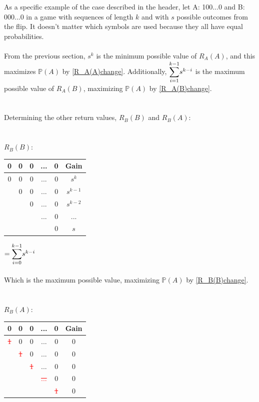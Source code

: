 \documentclass[english,12pt,a4paper,final]{article}
\begin{document}
As a specific example of the case described in the header, let A: 100...0 and B: 000...0 in a game with sequences of length $k$ and with $s$ possible outcomes from the flip. It doesn't matter which symbols are used because they all have equal probabilities.
\\\\
From the previous section, $s^k$ is the minimum possible value of $R_A(A)$, and this maximizes $\mathbb{P}(A)$ by \eqref{R_A(A)change}. Additionally, $\mathlarger\sum_{i=1}^{k-1}s^{k-i}$ is the maximum possible value of $R_A(B)$, maximizing $\mathbb{P}(A)$ by \eqref{R_A(B)change}.
\\\\\\
Determining the other return values, $R_B(B)$ and $R_B(A)$:
\\\\\\
${R_B(B)}$:
\begin{tabular}{|ccccc|c|}
	\hline
	0 & 0 & 0 & ... & 0 & Gain \\
	\hline
	
	\textcolor{OliveGreen}{0} & \textcolor{OliveGreen}{0} & \textcolor{OliveGreen}{0} & \textcolor{OliveGreen}{...} & \textcolor{OliveGreen}{0} & $s^k$\\
	
	& \textcolor{OliveGreen}{0} & \textcolor{OliveGreen}{0} & \textcolor{OliveGreen}{...} & \textcolor{OliveGreen}{0} & $s^{k-1}$\\
	
	&  & \textcolor{OliveGreen}{0} & \textcolor{OliveGreen}{...} & \textcolor{OliveGreen}{0} & $s^{k-2}$ \\
	
	&  &  & \textcolor{OliveGreen}{...} & \textcolor{OliveGreen}{0} & ... \\
	
	&  &  &  & \textcolor{OliveGreen}{0} & $s$ \\
	\hline
\end{tabular}
$=\mathlarger\sum_{i=0}^{k-1}s^{k-i}$
\\\\
Which is the maximum possible value, maximizing $\mathbb{P}(A)$ by \eqref{R_B(B)change}.
\\\\\\
${R_B(A)}$:
\begin{tabular}{|ccccc|c|}
	\hline
	0 & 0 & 0 & ... & 0 & Gain \\
	\hline
	
	\textcolor{red}{\sout{1}} & 0 & 0 & ... & 0 & $0$\\
	
	& \textcolor{red}{\sout{1}} & 0 & ... & 0 & $0$\\
	
	&  & \textcolor{red}{\sout{1}} & ... & 0 & $0$\\
	
	&  &  & \textcolor{red}{\sout{...}} & 0 & $0$ \\
	
	&  &  &  & \textcolor{red}{\sout{1}} & $0$ \\
	\hline
\end{tabular}
\end{document}

